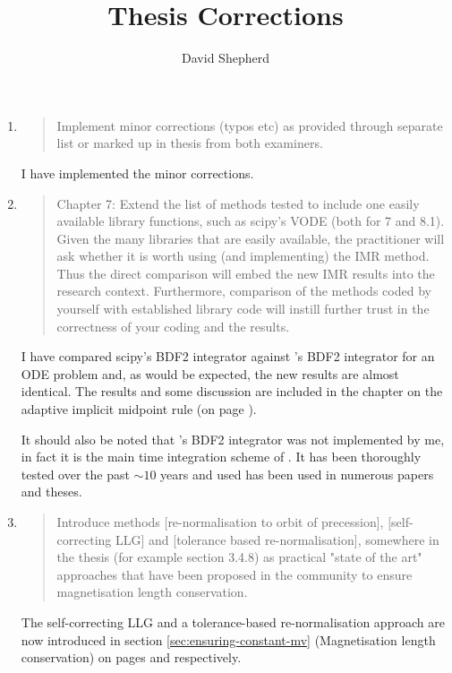 \documentclass[12pt,a4paper,pdftex]{article}
\title{Thesis Corrections}
\author{David Shepherd}
\begin{document}
\maketitle


\begin{enumerate}
\item
  \begin{quotation}
    Implement minor corrections (typos etc) as provided through
    separate list or marked up in thesis from both examiners.
  \end{quotation}
  I have implemented the minor corrections.

\item
  \begin{quotation}
    Chapter 7: Extend the list of methods tested to include one easily
    available library functions, such as scipy's VODE (both for 7 and
    8.1). Given the many libraries that are easily available, the
    practitioner will ask whether it is worth using (and implementing) the
    IMR method. Thus the direct comparison will embed the new IMR results
    into the research context. Furthermore, comparison of the methods
    coded by yourself with established library code will instill further
    trust in the correctness of your coding and the results.
  \end{quotation}
  I have compared scipy's \vode BDF2 integrator against \oomph's BDF2 integrator for an ODE problem and, as would be expected, the new results are almost identical. The results and some discussion are included in the chapter on the adaptive implicit midpoint rule (on page \pageref{fig:vode-osc-example}).

  It should also be noted that \oomph's BDF2 integrator was not implemented by me, in fact it is the main time integration scheme of \oomph.
  It has been thoroughly tested over the past $\sim 10$ years and used has been used in numerous papers and theses.

\item
  \begin{quotation}
    Introduce methods [re-normalisation to orbit of precession],
    [self-correcting LLG] and [tolerance based re-normalisation], somewhere
    in the thesis (for example section 3.4.8) as practical "state of the
    art" approaches that have been proposed in the community to ensure
    magnetisation length conservation.
  \end{quotation}
  The self-correcting LLG and a tolerance-based re-normalisation approach are now introduced in section \ref{sec:ensuring-constant-mv} (Magnetisation length conservation) on pages \pageref{sec:sc-llg} and \pageref{alt-ml-renorm-intro} respectively.


\end{enumerate}
\end{document}
